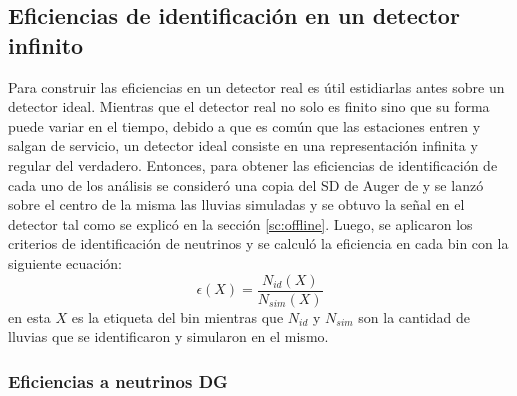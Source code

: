 	\subsection{Eficiencias de identificación en un detector infinito}
	\label{sbsc:idealEff}
	
	Para construir las eficiencias en un detector real es útil estidiarlas antes sobre un detector ideal.
	Mientras que el detector real no solo es finito sino que su forma puede variar en el tiempo, debido a que es común que las estaciones entren y salgan de servicio, un detector ideal consiste en una representación infinita y regular del verdadero.
	Entonces, para obtener las eficiencias de identificación de cada uno de los análisis se consideró una copia del SD de Auger de  y se lanzó sobre el centro de la misma las lluvias simuladas y se obtuvo la señal en el detector tal como se explicó en la sección \ref{sc:offline}.
	Luego, se aplicaron los criterios de identificación de neutrinos y se calculó la eficiencia en cada bin con la siguiente ecuación:
	\begin{equation}
	 \epsilon(X)=\frac{N_{id}(X)}{N_{sim}(X)}
	 \label{eq:effDef}
	\end{equation}
	en esta $X$ es la etiqueta del bin mientras que $N_{id}$ y $N_{sim}$ son la cantidad de lluvias que se identificaron y simularon en el mismo.
	
	\subsubsection{Eficiencias a neutrinos DG}
	

